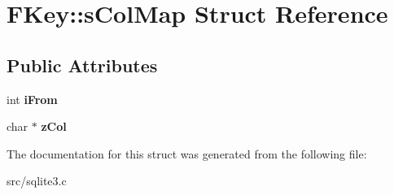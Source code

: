 \hypertarget{struct_f_key_1_1s_col_map}{\section{F\-Key\-:\-:s\-Col\-Map Struct Reference}
\label{struct_f_key_1_1s_col_map}
}
\subsection*{Public Attributes}
\begin{DoxyCompactItemize}
\item 
\hypertarget{struct_f_key_1_1s_col_map_a2b0ed19d4924a93d1f3f14f891b176ed}{int {\bfseries i\-From}}\label{struct_f_key_1_1s_col_map_a2b0ed19d4924a93d1f3f14f891b176ed}

\item 
\hypertarget{struct_f_key_1_1s_col_map_a4cdef475be73cc460873051a2c2c2937}{char $\ast$ {\bfseries z\-Col}}\label{struct_f_key_1_1s_col_map_a4cdef475be73cc460873051a2c2c2937}

\end{DoxyCompactItemize}


The documentation for this struct was generated from the following file\-:\begin{DoxyCompactItemize}
\item 
src/sqlite3.\-c\end{DoxyCompactItemize}
